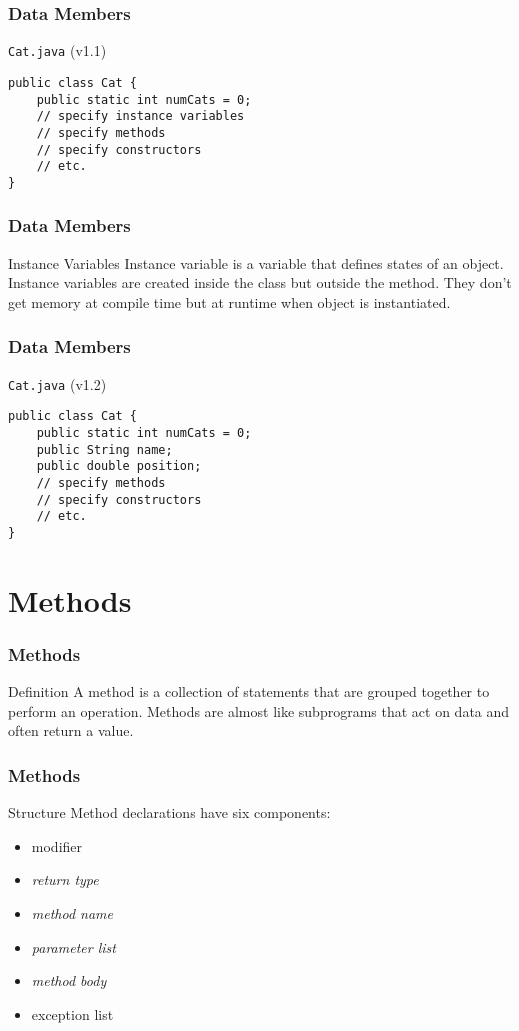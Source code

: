 \documentclass[10pt, compress]{beamer}
\begin{document}
\begin{frame}[fragile]
	\frametitle{Data Members}
	\begin{block}{\texttt{Cat.java} (v1.1)}
		\begin{verbatim}
public class Cat {
	public static int numCats = 0;
	// specify instance variables
	// specify methods
	// specify constructors
	// etc.
}
		\end{verbatim}
	\end{block}
\end{frame}

\begin{frame}[fragile]
	\frametitle{Data Members}
	\begin{block}{Instance Variables}
	Instance variable is a variable that defines states of an object. Instance variables are created inside the class but outside the method. They don't get memory at compile time but at runtime when object is instantiated.
	\end{block}
\end{frame}

\begin{frame}[fragile]
	\frametitle{Data Members}
	\begin{block}{\texttt{Cat.java} (v1.2)}
		\begin{verbatim}
public class Cat {
	public static int numCats = 0;
	public String name;
	public double position;
	// specify methods
	// specify constructors
	// etc.
}
		\end{verbatim}
	\end{block}
\end{frame}

\section{Methods}

\begin{frame}[fragile]
	\frametitle{Methods}
	\begin{block}{Definition}
	A method is a collection of statements that are grouped together to perform an operation. Methods are almost like subprograms that act on data and often return a value.
	\end{block}
\end{frame}

\begin{frame}[fragile]
	\frametitle{Methods}
	\begin{block}{Structure}
	Method declarations have six components:
	\begin{itemize}
		\item[] modifier
		\item[] \emph{return type}
		\item[] \emph{method name}
		\item[] \emph{parameter list}
		\item[] \emph{method body}
		\item[] exception list
	\end{itemize}
	\end{block}
\end{frame}
\end{document}
